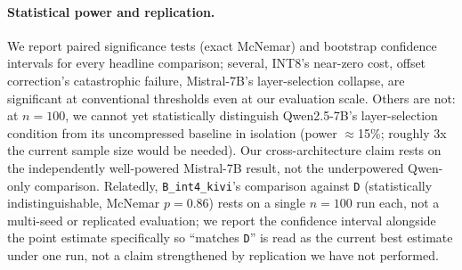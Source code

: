 \documentclass[11pt]{article}
\begin{document}
\paragraph{Statistical power and replication.} We report paired
significance tests (exact McNemar) and bootstrap confidence intervals for
every headline comparison; several, INT8's near-zero cost, offset
correction's catastrophic failure, Mistral-7B's layer-selection collapse,
are significant at conventional thresholds even at our evaluation scale.
Others are not: at $n=100$, we cannot yet statistically distinguish
Qwen2.5-7B's layer-selection condition from its uncompressed baseline in
isolation (power $\approx$15\%; roughly 3x the current sample size would
be needed). Our cross-architecture claim rests on the independently
well-powered Mistral-7B result, not the underpowered Qwen-only
comparison. Relatedly, \texttt{B\_int4\_kivi}'s comparison against
\texttt{D} (statistically indistinguishable, McNemar $p=0.86$) rests on a
single $n=100$ run each, not a multi-seed or replicated evaluation; we
report the confidence interval alongside the point estimate specifically
so ``matches \texttt{D}'' is read as the current best estimate under one
run, not a claim strengthened by replication we have not performed.
\end{document}
